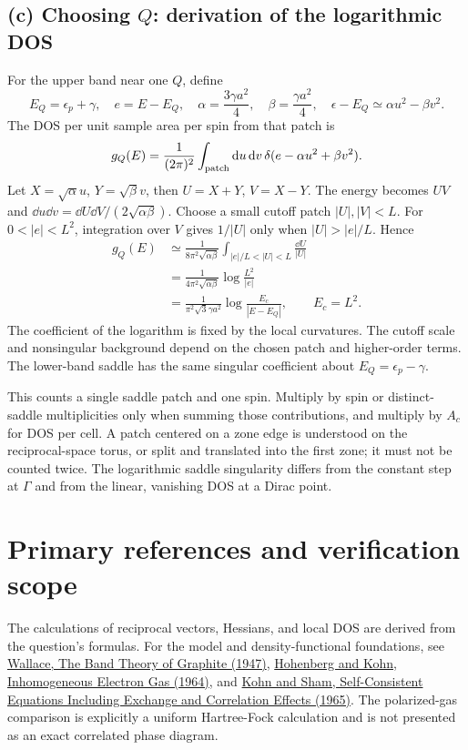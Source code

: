 \subsection*{(c) Choosing $Q$: derivation of the logarithmic DOS}
For the upper band near one $Q$, define
\[
E_Q=\epsilon_p+\gamma,\quad e=E-E_Q,\quad
\alpha=\frac{3\gamma a^2}{4},\quad\beta=\frac{\gamma a^2}{4},\quad
\epsilon-E_Q\simeq\alpha u^2-\beta v^2.
\]
The DOS per unit sample area per spin from that patch is
\[
g_Q(E)=\frac1{(2\pi)^2}\int_{\rm patch}\mathop{}\!\mathrm{d} u\mathop{}\!\mathrm{d} v\,
\delta(e-\alpha u^2+\beta v^2).
\]
Let $X=\sqrt\alpha u$, $Y=\sqrt\beta v$, then $U=X+Y$, $V=X-Y$. The energy becomes $UV$ and
$\dd u\dd v=\dd U\dd V/(2\sqrt{\alpha\beta})$.
Choose a small cutoff patch $|U|,|V|<L$. For $0<|e|<L^2$, integration over $V$ gives $1/|U|$ only when $|U|>|e|/L$. Hence
\begin{align*}
g_Q(E)&\simeq\frac1{8\pi^2\sqrt{\alpha\beta}}
\int_{|e|/L<|U|<L}\frac{\dd U}{|U|}\\
&=\frac1{4\pi^2\sqrt{\alpha\beta}}\log\frac{L^2}{|e|}\\
&=\boxed{\frac1{\pi^2\sqrt3\gamma a^2}
\log\frac{E_c}{|E-E_Q|},\qquad E_c=L^2.}
\end{align*}
The coefficient of the logarithm is fixed by the local curvatures. The cutoff scale and nonsingular background depend on the chosen patch and higher-order terms. The lower-band saddle has the same singular coefficient about $E_Q=\epsilon_p-\gamma$.

This counts a single saddle patch and one spin. Multiply by spin or distinct-saddle multiplicities only when summing those contributions, and multiply by $A_c$ for DOS per cell. A patch centered on a zone edge is understood on the reciprocal-space torus, or split and translated into the first zone; it must not be counted twice. The logarithmic saddle singularity differs from the constant step at $\Gamma$ and from the linear, vanishing DOS at a Dirac point.

\section*{Primary references and verification scope}
The calculations of reciprocal vectors, Hessians, and local DOS are derived from the question's formulas. For the model and density-functional foundations, see
\href{https://doi.org/10.1103/PhysRev.71.622}{Wallace, The Band Theory of Graphite (1947)},
\href{https://doi.org/10.1103/PhysRev.136.B864}{Hohenberg and Kohn, Inhomogeneous Electron Gas (1964)},
and
\href{https://doi.org/10.1103/PhysRev.140.A1133}{Kohn and Sham, Self-Consistent Equations Including Exchange and Correlation Effects (1965)}.
The polarized-gas comparison is explicitly a uniform Hartree-Fock calculation and is not presented as an exact correlated phase diagram.
